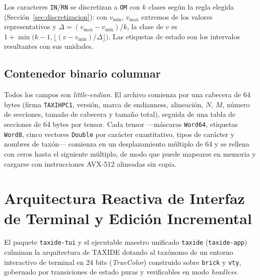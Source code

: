 \documentclass[11pt,a4paper]{article}
\theoremstyle{definition}
\theoremstyle{remark}
\begin{document}
Los caracteres \texttt{IN}/\texttt{RN} se discretizan a \texttt{OM} con $k$ clases según la regla elegida (Sección~\ref{sec:discretizacion}): con $v_{\min}$, $v_{\max}$ extremos de los valores representativos y $\Delta = (v_{\max}-v_{\min})/k$, la clase de $v$ es $1 + \min\!\big(k-1, \lfloor (v - v_{\min})/\Delta \rfloor\big)$. Las etiquetas de estado son los intervalos resultantes con sus unidades.

\subsection{Contenedor binario columnar}
Todos los campos son \textit{little-endian}. El archivo comienza por una cabecera de 64 bytes (firma \texttt{TAXIHPC1}, versión, marca de endianness, alineación, $N$, $M$, número de secciones, tamaño de cabecera y tamaño total), seguida de una tabla de secciones de 64 bytes por tensor. Cada tensor ---máscaras \texttt{Word64}, etiquetas \texttt{Word8}, cinco vectores \texttt{Double} por carácter cuantitativo, tipos de carácter y nombres de taxón--- comienza en un desplazamiento múltiplo de 64 y se rellena con ceros hasta el siguiente múltiplo, de modo que puede mapearse en memoria y cargarse con instrucciones AVX-512 alineadas sin copia.

\section{Arquitectura Reactiva de Interfaz de Terminal y Edición Incremental}
\label{sec:tui}

El paquete \texttt{taxide-tui} y el ejecutable maestro unificado \texttt{taxide} (\texttt{taxide-app}) culminan la arquitectura de TAXIDE dotando al taxónomo de un entorno interactivo de terminal en 24 bits (\textit{TrueColor}) construido sobre \texttt{brick} y \texttt{vty}, gobernado por transiciones de estado puras y verificables en modo \textit{headless}.
\end{document}
